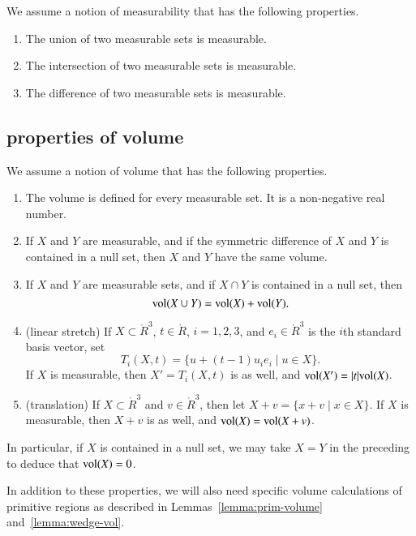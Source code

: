 We assume a notion of measurability that has the following properties.

\begin{enumerate}%
 \item The union of two measurable sets is measurable.\\
 \item The intersection of two measurable sets is measurable.\\
 \item The difference of two measurable sets is measurable.
\end{enumerate}

\subsection{properties of volume}\label{sec:volume}

We assume a notion of volume that has the following properties.

\begin{enumerate}%
 \item The volume is defined for every measurable set.  It is
    a non-negative real number.
 \item If $X$ and $Y$ are  measurable, and if
 the symmetric difference of
 $X$ and $Y$ is contained in a null set, then 
    $X$ and $Y$ have the same volume.\\
 \item If $X$ and $Y$ are measurable sets, and if $X\cap
 Y$ is contained in a null set, then
    $$
    {\operatorname{vol}}(X\cup Y) = {\operatorname{vol}}(X) + {\operatorname{vol}}(Y).
    $$
  \item (linear stretch) If $X\subset \ring{R}^3$, $t\in\ring{R}$, 
    $i=1,2,3$, and $e_i\in\ring{R}^3$ is the $i$th standard basis vector,
    set 
      $$T_i(X,t) = \{ u + (t-1) u_i e_i \mid u\in X\}.
      $$
    If $X$ is measurable, then $X'=T_i(X,t)$ is as well,
    and ${\operatorname{vol}}(X') = |t|{\operatorname{vol}}(X)$.
  \item (translation) If $X\subset \ring{R}^3$ and $v\in\ring{R}^3$, then let
    $X+v = \{x + v\mid x\in X\}$.  If $X$ is measurable, then $X+v$ is
    as well, and ${\operatorname{vol}}(X) = {\operatorname{vol}}(X+v)$.
\end{enumerate}

In particular, if $X$ is contained in a null set, we may take
$X=Y$ in the preceding to deduce that ${\operatorname{vol}}(X)=0$.

In addition to these properties, we will also need specific
volume calculations of primitive regions as described in
Lemmas~\ref{lemma:prim-volume} and~\ref{lemma:wedge-vol}.

